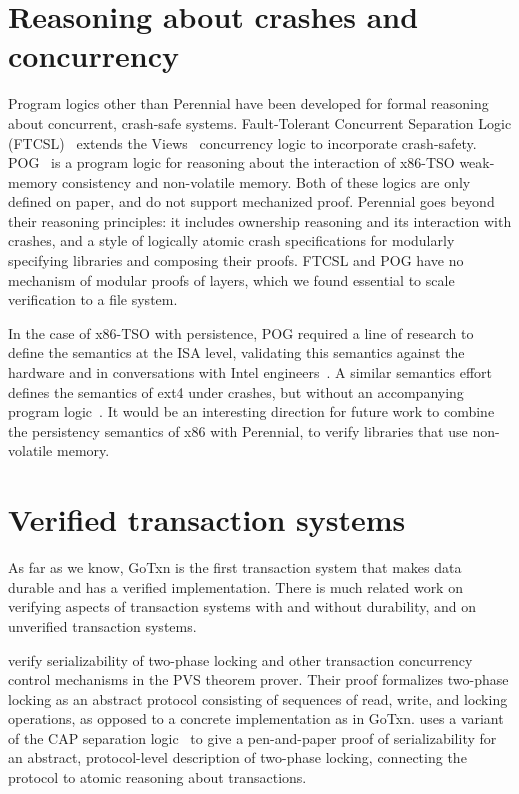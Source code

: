 \section{Reasoning about crashes and concurrency}
\label{sec:rel:crashes-concurrency}

Program logics other than Perennial have been developed for formal reasoning
about concurrent, crash-safe systems. Fault-Tolerant Concurrent Separation Logic
(FTCSL)~\cite{ntzik:faults} extends the Views~\cite{dinsdale:views} concurrency
logic to incorporate crash-safety. POG~\cite{raad:pog} is a program logic for
reasoning about the interaction of x86-TSO weak-memory consistency and
non-volatile memory. Both of these logics are only defined on paper, and do not
support mechanized proof. Perennial goes beyond their reasoning principles: it
includes ownership reasoning and its interaction with crashes, and a style of
logically atomic crash specifications for modularly specifying libraries and
composing their proofs. FTCSL and POG have no mechanism of modular proofs of
layers, which we found essential to scale verification to a file system.

In the case of x86-TSO with persistence, POG required a line of research to
define the semantics at the
ISA level, validating this semantics against the hardware and in conversations
with Intel engineers~\cite{raad:px86,raad:px86-extended}. A similar semantics effort defines the
semantics of ext4 under crashes, but without an accompanying program
logic~\cite{kokologiannakis:persevere}. It would be an interesting direction for
future work to combine the persistency semantics of x86 with Perennial, to
verify libraries that use non-volatile memory.

\section{Verified transaction systems}
\label{sec:rel:verified-txn}

As far as we know, GoTxn is the first transaction system that makes data durable
and has a verified implementation. There is much related work on verifying
aspects of transaction systems with and without durability, and on unverified
transaction systems.

\citet{ChkliaevHS99} verify serializability of two-phase locking and other
transaction concurrency control mechanisms in the PVS theorem prover. Their
proof formalizes two-phase locking as an abstract protocol consisting of
sequences of read, write, and locking operations, as opposed to a concrete
implementation as in GoTxn. \citet{pollak-2PL} uses a variant of the
CAP separation logic~\citep{dinsdale:cap} to give a pen-and-paper
proof of serializability for an abstract, protocol-level description of
two-phase locking, connecting the protocol to atomic reasoning about
transactions.

